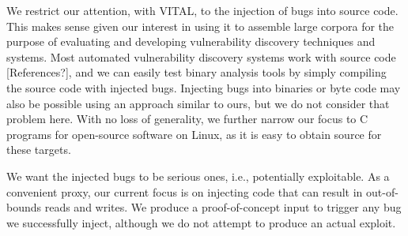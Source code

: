 
We restrict our attention, with VITAL, to the injection of bugs into source code.
This makes sense given our interest in using it to assemble large corpora for the purpose of evaluating and developing vulnerability discovery techniques and systems.
Most automated vulnerability discovery systems work with source code [References?], and we can easily test binary analysis tools by simply compiling the source code with injected bugs.
Injecting bugs into binaries or byte code may also be possible using an approach similar to ours, but we do not consider that problem here.
With no loss of generality, we further narrow our focus to C programs for open-source software on Linux, as it is easy to obtain source for these targets.

We want the injected bugs to be serious ones, i.e., potentially exploitable.
As a convenient proxy, our current focus is on injecting code that can result in out-of-bounds reads and writes.  
We produce a proof-of-concept input to trigger any bug we successfully inject, although we do not attempt to produce an actual exploit.
